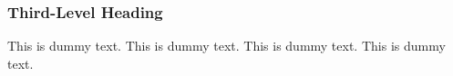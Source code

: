 \subsubsection{Third-Level Heading}
This is dummy text. This is dummy text. This is dummy text. This is dummy text. 
